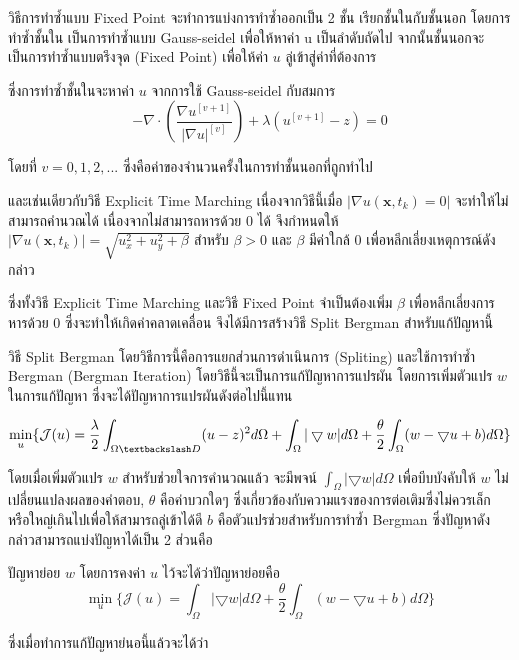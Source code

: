 \documentclass[hidelinks,a4paper,14pt]{article}
\numberwithin{equation}{section}							%
\begin{document}
{		วิธีการทำซ้ำแบบ Fixed Point \cite{ref:FixpointSolver} จะทำการแบ่งการทำซ้ำออกเป็น  2 ชั้น เรียกชั้นในกับชั้นนอก โดยการทำซ้ำชั้นใน เป็นการทำซ้ำแบบ Gauss-seidel เพื่อให้หาค่า u เป็นลำดับถัดไป จากนั้นชั้นนอกจะเป็นการทำซ้ำแบบตรึงจุด (Fixed Point) เพื่อให้ค่า $u$ ลู่เข้าสู่ค่าที่ต้องการ 
		
		ซึ่งการทำซ้ำชั้นในจะหาค่า $u$ จากการใช้ Gauss-seidel กับสมการ
		$$
		- \nabla\cdot\left(\frac{\nabla u^{[v+1]}}{{\lvert \nabla u \rvert}^{[v]} }\right) + \lambda(u^{[v+1]}-z)  = 0
		$$
		
		โดยที่ $v = 0,1,2,... $ ซึ่งคือค่าของจำนวนครั้งในการทำชั้นนอกที่ถูกทำไป
		
		และเช่นเดียวกับวิธี Explicit Time Marching เนื่องจากวิธีนี้เมื่อ $\lvert \nabla u ( \mathbf{x},t_k) = 0\rvert $ จะทำให้ไม่สามารถคำนวณได้ เนื่องจากไม่สามารถหารด้วย 0 ได้ จึงกำหนดให้ $\lvert \nabla u ( \mathbf{x},t_k) \rvert = \sqrt{u_x^2+u_y^2 + \beta}$ สำหรับ $\beta > 0$ และ $\beta$ มีค่าใกล้ 0 เพื่อหลีกเลี่ยงเหตุการณ์ดังกล่าว
		
		ซึ่งทั้งวิธี Explicit Time Marching และวิธี Fixed Point จำเป็นต้องเพิ่ม $\beta$ เพื่อหลีกเลี่ยงการหารด้วย 0 ซึ่งจะทำให้เกิดค่าคลาดเคลื่อน  จึงได้มีการสร้างวิธี Split Bergman สำหรับแก้ปัญหานี้
		
		วิธี Split Bergman \cite{ref:splitbergman-inpaint} โดยวิธีการนี้คือการแยกส่วนการดำเนินการ (Spliting) และใช้การทำซ้ำ Bergman (Bergman Iteration)  โดยวิธีนี้จะเป็นการแก้ปัญหาการแปรผัน โดยการเพิ่มตัวแปร $w$ ในการแก้ปัญหา ซึ่งจะได้ปัญหาการแปรผันดังต่อไปนี้แทน
		
			$$\min_{u} \{ \mathcal{J}(u) = \frac{\lambda}{2} \int_{\Omega \textbackslash D} (u-z)^2 d\Omega +  \int_{\Omega}  |\bigtriangledown w|  d\Omega + \frac{\theta}{2} \int_{\Omega} (w - \bigtriangledown u + b) d\Omega \}$$
			
			โดยเมื่อเพิ่มตัวแปร $w$ สำหรับช่วยใจการคำนวณแล้ว จะมีพจน์ $ \int_{\Omega}  |\bigtriangledown w|  d\Omega$ เพื่อบีบบังคับให้ $w$ ไม่เปลี่ยนแปลงผลของคำตอบ, $\theta$ คือค่าบวกใดๆ ซึ่งเกี่ยวข้องกับความแรงของการต่อเติมซึ่งไม่ควรเล็กหรือใหญ่เกินไปเพื่อให้สามารถลู่เข้าได้ดี $b$ คือตัวแปรช่วยสำหรับการทำซ้ำ Bergman ซึ่งปัญหาดังกล่าวสามารถแบ่งปัญหาได้เป็น 2 ส่วนคือ
			
			ปัญหาย่อย $w$ โดยการคงค่า $u$ ไว้จะได้ว่าปัญหาย่อยคือ
			$$\min_{u} \{ \mathcal{J}(u) =  \int_{\Omega}  |\bigtriangledown w|  d\Omega + \frac{\theta}{2} \int_{\Omega} (w - \bigtriangledown u + b) d\Omega \}$$
			
			ซึ่งเมื่อทำการแก้ปัญหาย่นอนี้แล้วจะได้ว่า
			
}
\end{document}
